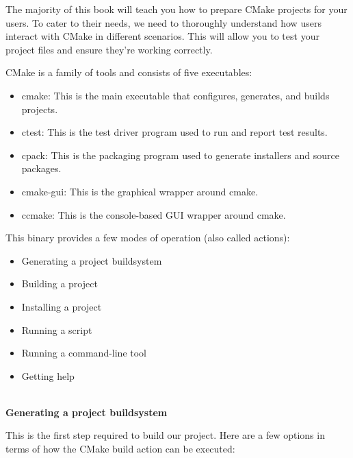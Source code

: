 
The majority of this book will teach you how to prepare CMake projects for your users. To cater to their needs, we need to thoroughly understand how users interact with CMake in different scenarios. This will allow you to test your project files and ensure they're working correctly.

CMake is a family of tools and consists of five executables:

\begin{itemize}
\item 
cmake: This is the main executable that configures, generates, and builds projects.

\item 
ctest: This is the test driver program used to run and report test results.

\item 
cpack: This is the packaging program used to generate installers and source packages.

\item 
cmake-gui: This is the graphical wrapper around cmake.

\item 
ccmake: This is the console-based GUI wrapper around cmake.
\end{itemize}


This binary provides a few modes of operation (also called actions):

\begin{itemize}
\item 
Generating a project buildsystem

\item 
Building a project

\item 
Installing a project

\item 
Running a script

\item 
Running a command-line tool

\item 
Getting help
\end{itemize}

\hspace*{\fill} \\ %
\noindent
\textbf{Generating a project buildsystem}

This is the first step required to build our project. Here are a few options in terms of how the CMake build action can be executed:

